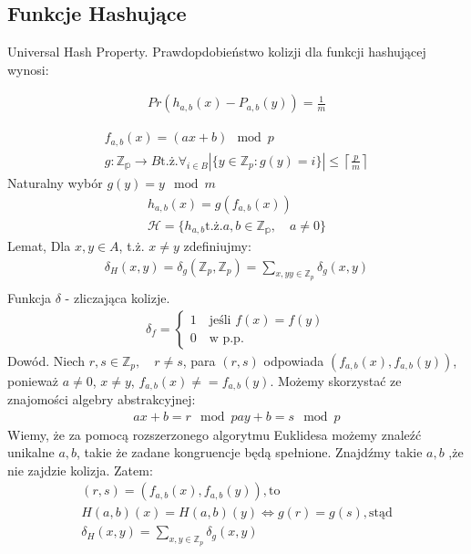\documentclass{article}
\numberwithin{equation}{subsection}
\begin{document}
\subsection{Funkcje Hashujące}

Universal Hash Property. Prawdopdobieństwo kolizji dla funkcji hashującej wynosi:

\begin{align}
    Pr(h_{a,b}(x) - P_{a,b}(y)) = \frac{1}{m}
\end{align}

\begin{align}
    f_{a,b} (x) = (ax+b) \mod p\\
    g: \mathbb{Z_p} \rightarrow B \text{t.ż.} \forall_{i\in B} |\{y\in\mathbb{Z}_p : g(y) = i\}| \leq \left\lceil \frac{p}{m} \right\rceil
\end{align}
Naturalny wybór $g(y) = y \mod m$
\begin{align}
    h_{a,b}(x) = g(f_{a,b}(x))\\
    \mathcal{H} = \{h_{a,b} \text{t.ż.} a,b\in\mathbb{Z_p},\quad a\neq 0 \}
\end{align}
Lemat, Dla $x,y\in A$, t.ż. $x\neq y$ zdefiniujmy:
\begin{align}
    \delta_H (x,y) = \delta_g (\mathbb{Z}_p, \mathbb{Z}_p) = \sum_{x,yy\in\mathbb{Z}_p} \delta_g (x,y)\\
\end{align}
Funkcja $\delta$ - zliczająca kolizje.
\begin{align}
    \delta_f = \begin{cases}
        1 \quad \text{jeśli } f(x)=f(y)\\
        0 \quad \text{w p.p.}
    \end{cases}
\end{align}
Dowód. Niech $r,s\in\mathbb{Z}_p,\quad r\neq s$, para $(r,s)$ odpowiada $(f_{a,b}(x),f_{a,b}(y))$, ponieważ $a\neq 0$, $x\neq y$, $f_{a,b}(x)\neq=f_{a,b}(y)$.
Możemy skorzystać ze znajomości algebry abstrakcyjnej:
\begin{align}
    ax + b = r \mod p
    ay + b = s \mod p
\end{align}
Wiemy, że za pomocą rozszerzonego algorytmu Euklidesa możemy znaleźć unikalne $a,b$, takie że zadane kongruencje będą spełnione.
Znajdźmy takie $a,b$ ,że nie zajdzie kolizja. Zatem:
\begin{align}
    (r,s) = (f_{a,b}(x),f_{a,b}(y)), \text{to}\\
    H(a,b)(x) = H(a,b)(y) \iff g(r)=g(s), \text{stąd}\\
    \delta_H(x,y) = \sum_{x,y\in\mathbb{Z}_p} \delta_g (x,y)
\end{align}
\end{document}
